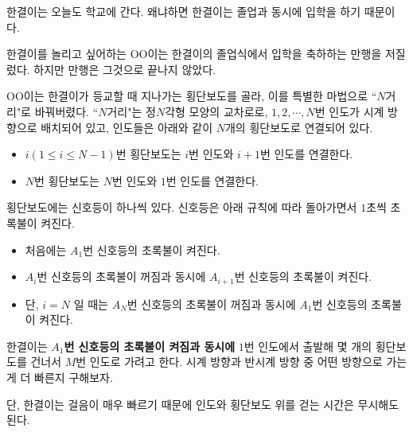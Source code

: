 한결이는 오늘도 학교에 간다. 왜냐하면 한결이는 졸업과 동시에 입학을 하기 때문이다.

한결이를 놀리고 싶어하는 OO이는 한결이의 졸업식에서 입학을 축하하는 만행을 저질렀다. 하지만 만행은 그것으로 끝나지 않았다.

OO이는 한결이가 등교할 때 지나가는 횡단보도를 골라, 이를 특별한 마법으로 ``$N$거리"로 바꿔버렸다. ``$N$거리"는 정$N$각형 모양의 교차로로, $1, 2, \cdots, N$번 인도가 시계 방향으로 배치되어 있고, 인도들은 아래와 같이 $N$개의 횡단보도로 연결되어 있다.

\begin{itemize}
    \item $i (1 \le i \le N-1)$번 횡단보도는 $i$번 인도와 $i+1$번 인도를 연결한다.
    \item $N$번 횡단보도는 $N$번 인도와 $1$번 인도를 연결한다.
\end{itemize}

횡단보도에는 신호등이 하나씩 있다. 신호등은 아래 규칙에 따라 돌아가면서 $1$초씩 초록불이 켜진다.

\begin{itemize}
    \item 처음에는 $A_1$번 신호등의 초록불이 켜진다.
    \item $A_i$번 신호등의 초록불이 꺼짐과 동시에 $A_{i+1}$번 신호등의 초록불이 켜진다.
    \item 단, $i = N$ 일 때는 $A_N$번 신호등의 초록불이 꺼짐과 동시에 $A_1$번 신호등의 초록불이 켜진다.
\end{itemize}

한결이는 \textbf{$A_1$번 신호등의 초록불이 켜짐과 동시에} $1$번 인도에서 출발해 몇 개의 횡단보도를 건너서 $M$번 인도로 가려고 한다. 시계 방향과 반시계 방향 중 어떤 방향으로 가는 게 더 빠른지 구해보자.

단, 한결이는 걸음이 매우 빠르기 때문에 인도와 횡단보도 위를 걷는 시간은 무시해도 된다.